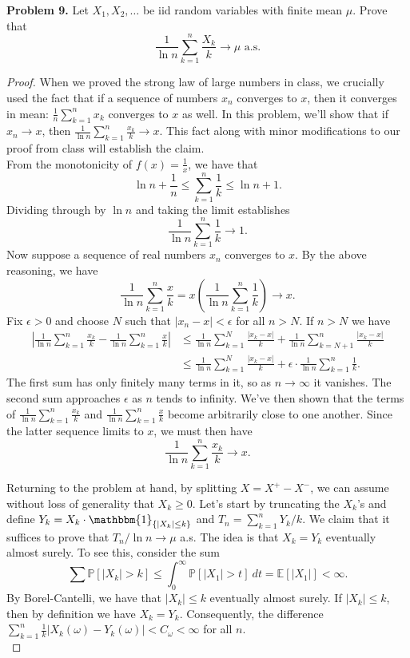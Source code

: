 \documentclass[11pt,letterpaper]{report}
\newcommand{\E}{\mathbb{E}}
\newcommand{\Prob}{\mathbb{P}}
\newcommand{\ind}{\mathbbm{1}}
\begin{document}
\noindent\textbf{Problem 9. }
Let $X_1, X_2, \ldots$ be iid random variables with finite mean $\mu$. Prove that
\[
\frac{1}{\ln n}\sum_{k=1}^n\frac{X_k}{k}\to \mu\text{ a.s.}
\]
\begin{proof}
	When we proved the strong law of large numbers in class, we crucially used the fact that if a sequence of numbers $x_n$ converges to $x$, then it converges in mean: $\frac{1}{n}\sum_{k=1}^n x_k$ converges to $x$ as well. In this problem, we'll show that if $x_n\to x$, then $\frac{1}{\ln n}\sum_{k=1}^n \frac{x_k}{k}\to x$. This fact along with minor modifications to our proof from class will establish the claim.\\

	\noindent From the monotonicity of $f(x) = \frac{1}{x}$, we have that
	\[
	\ln n + \frac{1}{n} \leq \sum_{k=1}^n \frac{1}{k}\leq \ln n + 1.
	\]
	Dividing through by $\ln n$ and taking the limit establishes
	\[
	\frac{1}{\ln n}\sum_{k=1}^n \frac{1}{k} \to 1.
	\]
	\noindent Now suppose a sequence of real numbers $x_n$ converges to $x$. By the above reasoning, we have
	\[
	\frac{1}{\ln n}\sum_{k=1}^n \frac{x}{k} = x\left(\frac{1}{\ln n}\sum_{k=1}^n\frac{1}{k}\right)\to x.
	\]
	Fix $\epsilon>0$ and choose $N$ such that $|x_n - x|<\epsilon$ for all $n > N$. If $n> N$ we have
	\begin{align*}
		\left|\frac{1}{\ln n}\sum_{k=1}^n\frac{x_k}{k} - \frac{1}{\ln n}\sum_{k=1}^n\frac{x}{k}\right| &\leq \frac{1}{\ln n}\sum_{k = 1}^N\frac{|x_k - x|}{k} + \frac{1}{\ln n}\sum_{k=N+1}^n\frac{|x_k-x|}{k}\\
		&\leq \frac{1}{\ln n}\sum_{k=1}^N\frac{|x_k-x|}{k} + \epsilon \cdot \frac{1}{\ln n}\sum_{k=1}^n\frac{1}{k}.
	\end{align*}
	The first sum has only finitely many terms in it, so as $n\to \infty$ it vanishes. The second sum approaches $\epsilon$ as $n$ tends to infinity. We've then shown that the terms of $\frac{1}{\ln n}\sum_{k=1}^n\frac{x_k}{k}$ and $\frac{1}{\ln n}\sum_{k=1}^n\frac{x}{k}$ become arbitrarily close to one another. Since the latter sequence limits to $x$, we must then have
	\begin{equation}\label{harm_avg}
	\frac{1}{\ln n }\sum_{k=1}^n\frac{x_k}{k}\to x.
	\end{equation}

	\noindent Returning to the problem at hand, by splitting $X = X^+ - X^-$, we can assume without loss of generality that $X_k \geq 0$. Let's start by truncating the $X_k$'s and define $Y_k = X_k\cdot \ind_{\{|X_k|\leq k\}}$ and $T_n = \sum_{k=1}^n Y_k/k$. We claim that it suffices to prove that $T_n/\ln n \to \mu $ a.s. The idea is that $X_k = Y_k$ eventually almost surely. To see this, consider the sum
	\[
	\sum \Prob[|X_k| > k] \leq \int_0^\infty \Prob[|X_1|>t]\ dt = \E[|X_1|]<\infty.
	\]
	By Borel-Cantelli, we have that $|X_k|\leq k$ eventually almost surely. If $|X_k|\leq k$, then by definition we have $X_k = Y_k$. Consequently, the difference $\sum_{k=1}^n \frac{1}{k}|X_k(\omega) - Y_k(\omega)|<C_\omega<\infty$ for all $n$.\\


\end{proof}
\end{document}
